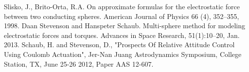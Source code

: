 \begin{thebibliography}{99}
 Slisko, J., Brito-Orta, R.A. On approximate formulas for the electrostatic force between two conducting spheres. American Journal of Physics 66 (4), 352–355, 1998.
 Daan Stevenson and Hanspeter Schaub. Multi-sphere method for modeling electrostatic forces and torques. Advances in Space Research, 51(1):10–20, Jan. 2013.
 Schaub, H. and Stevenson, D., "Prospects Of Relative Attitude Control Using Coulomb Actuation", Jer-Nan Juang Astrodynamics Symposium, College Station, TX, June 25-26 2012, Paper AAS 12-607.
\end{thebibliography}